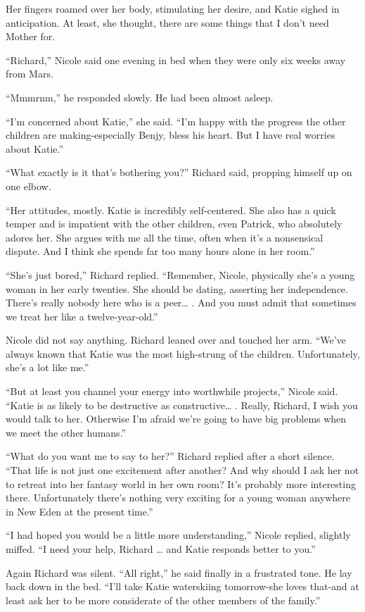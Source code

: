 \documentclass[]{article}
\begin{document}
{Her fingers roamed over her body, stimulating her desire, and Katie sighed in anticipation.  At least, she thought, there are some things that I don’t need Mother for.

“Richard,” Nicole said one evening in bed when they were only six weeks away from Mars.

“Mmmrnm,” he responded slowly.  He had been almost asleep.

“I’m concerned about Katie,” she said.  “I’m happy with the progress the other children are making-especially Benjy, bless his heart.  But I have real worries about Katie.”

“What exactly is it that’s bothering you?” Richard said, propping himself up on one elbow.

“Her attitudes, mostly.  Katie is incredibly self-centered.  She also has a quick temper and is impatient with the other children, even Patrick, who absolutely adores her.  She argues with me all the time, often when it’s a nonsensical dispute.  And I think she spends far too many hours alone in her room.”

“She’s just bored,” Richard replied.  “Remember, Nicole, physically she’s a young woman in her early twenties.  She should be dating, asserting her independence.  There’s really nobody here who is a peer… .  And you must admit that sometimes we treat her like a twelve-year-old.”

Nicole did not say anything.  Richard leaned over and touched her arm.  “We’ve always known that Katie was the most high-strung of the children.  Unfortunately, she’s a lot like me.”

“But at least you channel your energy into worthwhile projects,” Nicole said.  “Katie is as likely to be destructive as constructive… .  Really, Richard, I wish you would talk to her.  Otherwise I’m afraid we’re going to have big problems when we meet the other humans.”

“What do you want me to say to her?” Richard replied after a short silence.  “That life is not just one excitement after another? And why should I ask her not to retreat into her fantasy world in her own room? It’s probably more interesting there.  Unfortunately there’s nothing very exciting for a young woman anywhere in New Eden at the present time.”

“I had hoped you would be a little more understanding,” Nicole replied, slightly miffed.  “I need your help, Richard … and Katie responds better to you.”

Again Richard was silent.  “All right,” he said finally in a frustrated tone.  He lay back down in the bed.  “I’ll take Katie waterskiing tomorrow-she loves that-and at least ask her to be more considerate of the other members of the family.”

}
\end{document}
